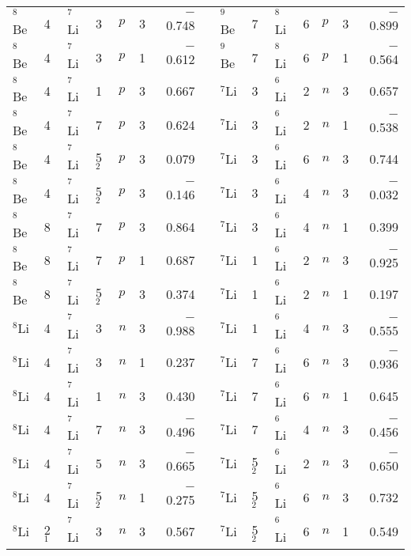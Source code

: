 \documentclass[
12pt, %
oneside, %
english, %
onehalfspacing, %
onehalfspacing, %
headsepline, %
]{MastersDoctoralThesis} %
\begin{document}
\begin{table*}[tp]
\begin{tabular*}{\textwidth}{@{\extracolsep{\fill}}llllllrl@{\extracolsep{\fill}}llllllr@{\extracolsep{\fill}}}
$^8$Be  & 4  & ${}^7$Li   & 3   & $p$       & 3   & $-$0.748 &  & ${}^9$Be  & 7  & ${}^8$Li    & 6   & $p$       & 3   & $-$0.899  \\
$^8$Be  & 4  & ${}^7$Li   & 3   & $p$       & 1   & $-$0.612 &  & ${}^9$Be  & 7  & ${}^8$Li    & 6   & $p$       & 1   & $-$0.564  \\
$^8$Be  & 4  & ${}^7$Li   & 1   & $p$       & 3   & 0.667  &  & ${}^7$Li  & 3  & ${}^6$Li   & 2   & $n$       & 3   & 0.657   \\
$^8$Be  & 4  & ${}^7$Li   & 7   & $p$       & 3   & 0.624  &  & ${}^7$Li  & 3  & ${}^6$Li   & 2   & $n$       & 1   & $-$0.538  \\
$^8$Be  & 4  & ${}^7$Li   & 5$_2$   & $p$       & 3   & 0.079  &  & ${}^7$Li  & 3  & ${}^6$Li   & 6   & $n$       & 3   & 0.744   \\
$^8$Be  & 4  & ${}^7$Li   & 5$_2$   & $p$       & 3   & $-$0.146 &  & ${}^7$Li  & 3  & ${}^6$Li   & 4   & $n$       & 3   & $-$0.032  \\
$^8$Be  & 8  & ${}^7$Li   & 7   & $p$       & 3   & 0.864  &  & ${}^7$Li  & 3  & ${}^6$Li   & 4   & $n$       & 1   & 0.399   \\
$^8$Be  & 8  & ${}^7$Li   & 7   & $p$       & 1   & 0.687  &  & ${}^7$Li  & 1  & ${}^6$Li   & 2   & $n$       & 3   & $-$0.925  \\
$^8$Be  & 8  & ${}^7$Li   & 5$_2$   & $p$       & 3   & 0.374  &  & ${}^7$Li  & 1  & ${}^6$Li   & 2   & $n$       & 1   & 0.197   \\
$^8$Li  & 4  & ${}^7$Li   & 3   & $n$       & 3   & $-$0.988 &  & ${}^7$Li  & 1  & ${}^6$Li   & 4   & $n$       & 3   & $-$0.555  \\
$^8$Li  & 4  & ${}^7$Li   & 3   & $n$       & 1   & 0.237  &  & ${}^7$Li  & 7  & ${}^6$Li   & 6   & $n$       & 3   & $-$0.936  \\
$^8$Li  & 4  & ${}^7$Li   & 1   & $n$       & 3   & 0.430   &  & ${}^7$Li  & 7  & ${}^6$Li   & 6   & $n$       & 1   & 0.645   \\
$^8$Li  & 4  & ${}^7$Li   & 7   & $n$       & 3   & $-$0.496 &  & ${}^7$Li  & 7  & ${}^6$Li   & 4   & $n$       & 3   & $-$0.456  \\
$^8$Li  & 4  & ${}^7$Li   & 5   & $n$       & 3   & $-$0.665 &  & ${}^7$Li  & 5$_2$  & ${}^6$Li   & 2   & $n$       & 3   & $-$0.650   \\
$^8$Li  & 4  & ${}^7$Li   & 5$_2$   & $n$       & 1   & $-$0.275 &  & ${}^7$Li  & 5$_2$  & ${}^6$Li   & 6   & $n$       & 3   & 0.732   \\
$^8$Li  & 2$_1$  & ${}^7$Li   & 3   & $n$       & 3   & 0.567  &  & ${}^7$Li  & 5$_2$  & ${}^6$Li   & 6   & $n$       & 1   & 0.549   \\

\end{tabular*}
\end{table*}
\end{document}
